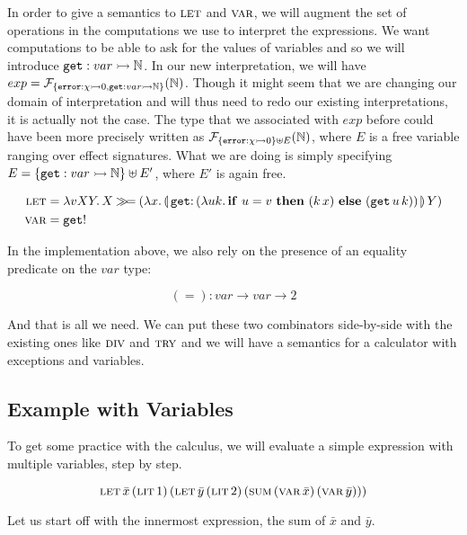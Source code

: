 In order to give a semantics to $\textsc{let}$ and $\textsc{var}$, we will augment the
set of operations in the computations we use to interpret the
expressions. We want computations to be able to ask for the values of
variables and so we will introduce $\mathtt{get} : var \rightarrowtail \mathbb{N}$. In our new
interpretation, we will have $exp =
\mathcal{F}_{\{\mathtt{error} : \chi \rightarrowtail 0,\mathtt{get} : var \rightarrowtail \mathbb{N}\}}(\mathbb{N})$. Though it
might seem that we are changing our domain of interpretation and will thus
need to redo our existing interpretations, it is actually not the case. The
type that we associated with $exp$ before could have been more precisely
written as $\mathcal{F}_{\{\mathtt{error} : \chi \rightarrowtail 0\} \uplus E}(\mathbb{N})$, where $E$ is
a free variable ranging over effect signatures. What we are doing is simply
specifying $E = \{\mathtt{get} : var \rightarrowtail \mathbb{N}\} \uplus E'$, where $E'$ is again
free.

\begin{align*}
  \lete &= \lam{v X Y}{X \hsbind
    (\lam{x}{\ap{\banana{\onto{\op{get}}{(\lam{u k}{\ifte{u = v}{(\ap{k}{x})}{(\app{\op{get}}{u}{k})}})}}}{Y}})} \\
  \vare &= \op{get}!
\end{align*}

In the implementation above, we also rely on the presence of an equality
predicate on the $var$ type:

 $$
  (=) : var \to var \to 2
 $$

And that is all we need. We can put these two combinators side-by-side with
the existing ones like $\textsc{div}$ and $\textsc{try}$ and we will have a semantics for
a calculator with exceptions and variables.

\subsection{Example with Variables}

To get some practice with the calculus, we will evaluate a simple
expression with multiple variables, step by step.

$$
\textsc{let}\,\bar{x}\,(\textsc{lit}\,1)\,(\textsc{let}\,\bar{y}\,(\textsc{lit}\,2)\,(\textsc{sum}\,(\textsc{var}\,\bar{x})\,(\textsc{var}\,\bar{y})))
$$

Let us start off with the innermost expression, the sum of $\bar{x}$ and
$\bar{y}$.

